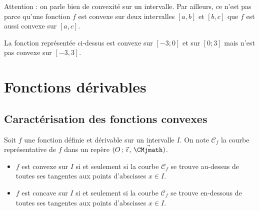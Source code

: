 \documentclass[11pt,fleqn, openany]{book} %
\begin{document}
\begin{example}Attention : on parle bien de convexité sur un intervalle. Par ailleurs, ce n'est pas parce qu'une fonction $f$ est convexe sur deux intervalles $[a,b]$ et $[b,c]$ que $f$ est aussi convexe sur $[a,c]$.

\begin{center}
\end{center}

La fonction représentée ci-dessus est convexe sur $[-3;0]$ et sur $[0;3]$ mais n'est pas convexe sur $[-3,3]$.\end{example}


\section{Fonctions dérivables}

\subsection{Caractérisation des fonctions convexes}

\begin{proposition}Soit $f$ une fonction définie et dérivable sur un intervalle $I$. On note $\mathcal{C}_f$ la courbe représentative de $f$ dans un repère $\Oij$.
\begin{itemize}
\item $f$ est convexe sur $I$ si et seulement si la courbe $\mathcal{C}_f$ se trouve au-dessus de toutes ses tangentes aux points d'abscisses $x\in I$.
\item $f$ est concave sur $I$ si et seulement si la courbe $\mathcal{C}_f$ se trouve en-dessous de toutes ses tangentes aux points d'abscisses $x\in I$.
\end{itemize}\end{proposition}
\end{document}
